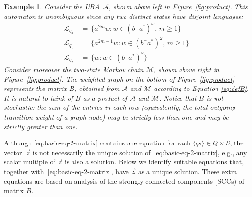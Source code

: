 \documentclass{elsarticle}
\newtheorem{example}[definition]{Example}
\def\<{\langle}
\def\>{\rangle}
\def\cA{\mathcal{A}}
\def\cL{\mathcal{L}}
\def\cM{\mathcal{M}}
\begin{document}
\begin{example}
Consider the UBA~$\cA$, shown above left in
Figure~\ref{fig:product}.  This automaton is unambiguous since any two
distinct states have disjoint languages:
\begin{align*}
\cL_{q_0} & \ = \ \{ a^{2 m} w : w \in (b^+a^*)^\omega,\, m \geqslant 1 \}\\
\cL_{q_1} & \ = \ \{ a^{2 m - 1} w : w \in (b^+a^*)^\omega,\, m \geqslant 1 \} \\
\cL_{q_2} & \ = \ \{ w : w \in (b^+a^*)^\omega \}
\end{align*}
Consider moreover the
two-state Markov chain $\cM$, shown above right in
Figure~\ref{fig:product}.  The weighted graph on the bottom of
Figure~\ref{fig:product} represents the matrix $B$, obtained from
$\cA$ and $\cM$ according to Equation \eqref{eq:defB}.  It is natural
to think of $B$ as a product of $\cA$ and $\cM$.  Notice that $B$ is
not stochastic: the sum of the entries in each row (equivalently, the
total outgoing transition weight of a graph node) may be strictly less
than one and may be strictly greater than one.
\label{ex:product}
\end{example}

Although \eqref{eq:basic-eq-2-matrix} contains one equation for each
$\<q s\> \in Q \times S$, the vector~$\vec{z}$ is not necessarily the
unique solution of~\eqref{eq:basic-eq-2-matrix}, e.g., any scalar
multiple of $\vec{z}$ is also a solution.  Below we identify suitable
equations that, together with~\eqref{eq:basic-eq-2-matrix}, have
$\vec{z}$ as a unique solution.  These extra equations are based on
analysis of the strongly connected components (SCCs) of matrix $B$.
\end{document}
